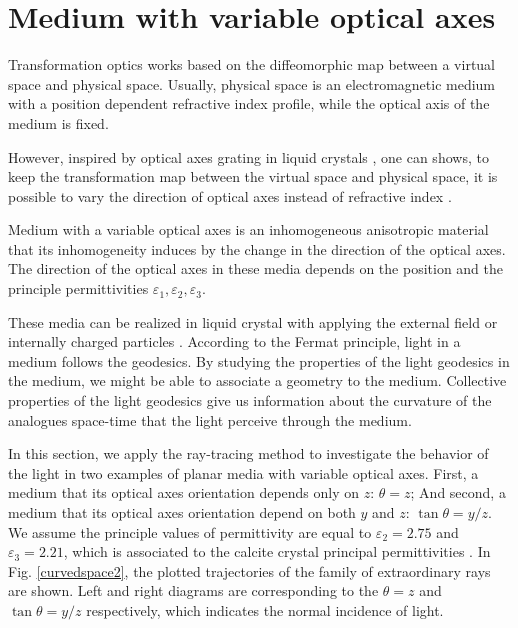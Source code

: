 \documentclass[9pt,twocolumn,twoside]{osajnl}
\begin{document}
\section{Medium with variable optical axes}

Transformation optics works based on the diffeomorphic map between a virtual space and physical space. Usually, physical space is an electromagnetic medium with a position dependent refractive index profile, while the optical axis of the medium is fixed. 

However, inspired by optical axes grating in liquid crystals \cite{Sarkissian, NERSISYAN}, one can shows, to keep the transformation map between the virtual space and physical space, it is possible to vary the direction of optical axes instead of refractive index \cite{liang2012transformation}.  

Medium with a variable optical axes is an inhomogeneous anisotropic material that its inhomogeneity induces by the change in the direction of the optical axes. The direction of the optical axes in these media depends on the position and the principle permittivities $\varepsilon_{1}, \varepsilon_{2}, \varepsilon_{3}$.

These media can be realized in liquid crystal with applying the external field or internally charged particles \cite{sluijter2010ray}.
According to the Fermat principle, light  in a medium follows the geodesics. By studying the properties of the light geodesics in the medium, we might be able to associate a geometry to the medium.
Collective properties of the light geodesics give us information about the curvature of the analogues space-time that the light perceive through the medium.

In this section, we apply the ray-tracing method to investigate the behavior of the light in two examples of planar media with variable optical axes. First, a medium that its optical axes orientation depends only on  $z$: $\theta=z$;  And second, a medium that its optical axes orientation depend on both $y$ and $z$: $\tan{\theta}=y/z$. We assume the principle values of permittivity are equal to  $\varepsilon_{2}=2.75$ and $\varepsilon_{3}=2.21$, which is associated to the calcite crystal principal permittivities \cite{yariv1984optical}. In Fig. \ref{curvedspace2}, the plotted trajectories of the family of extraordinary rays are shown. Left and right diagrams are corresponding to the $\theta=z$ and $\tan{\theta}=y/z$ respectively, which indicates the normal incidence of light. 
\end{document}
